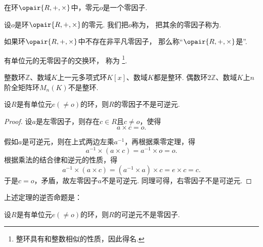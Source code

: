 \begin{proposition}
在环\(\opair{R,+,\times}\)中，零元\(o\)是一个零因子.
\end{proposition}

\begin{definition}
设\(o\)是环\(\opair{R,+,\times}\)的零元.
我们把\(o\)称为，
把其余的零因子称为.
\end{definition}

\begin{definition}
如果环\(\opair{R,+,\times}\)中不存在非平凡零因子，
那么称“\(\opair{R,+,\times}\)是”.
\end{definition}

\begin{definition}
有单位元的无零因子的交换环，
称为%
\footnote{整环具有和整数相似的性质，因此得名.}.
\end{definition}

\begin{example}
整数环\(\mathbb{Z}\)、数域\(K\)上一元多项式环\(K[x]\)、数域\(K\)都是整环.
偶数环\(2\mathbb{Z}\)、数域\(K\)上\(n\)阶全矩阵环\(M_n(K)\)不是整环.
\end{example}

\begin{theorem}
设\(R\)是有单位元\(e(\neq o)\)的环，则\(R\)的零因子不是可逆元.
\begin{proof}
设\(a\)是左零因子，则存在\(c \in R\)且\(c \neq o\)，使得\begin{equation*}
	a \times c = o.
\end{equation*}

假如\(a\)是可逆元，则在上式两边左乘\(a^{-1}\)，再根据乘零定理，得\begin{equation*}
	a^{-1} \times (a \times c) = a^{-1} \times o = o.
\end{equation*}
根据乘法的结合律和逆元的性质，得\begin{equation*}
	a^{-1} \times (a \times c) = (a^{-1} \times a) \times c = e \times c = c.
\end{equation*}
于是\(c = o\)，矛盾，故左零因子\(a\)不是可逆元.
同理可得，右零因子不是可逆元.
\end{proof}
\end{theorem}

上述定理的逆否命题是：
\begin{corollary}
设\(R\)是有单位元\(e(\neq o)\)的环，则\(R\)的可逆元不是零因子.
\end{corollary}

